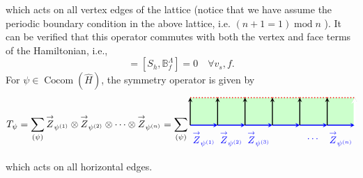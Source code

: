 \documentclass[a4paper,11pt]{article}
\theoremstyle{theorem}
\theoremstyle{remark}
\newcommand{\Av}{\mathbb{A}}
\newcommand{\Bf}{\mathbb{B}}
\newcommand{\ZR}{\overset{\rightarrow}{Z}}
\newcommand{\cone}{(1)}
\newcommand{\ctwo}{(2)}
\newcommand{\cthree}{(3)}
\newcommand{\Cocom}{\operatorname{Cocom}}
\begin{document}
which acts on all vertex edges of the lattice (notice that we have assume the periodic boundary condition in the above lattice, i.e. $(n+1=1 )\operatorname{mod} n$ ).
It can be verified that this operator commutes with both the vertex and face terms of the Hamiltonian, i.e.,
\begin{equation}
    [S_h, \Av_{v_s}^{\lambda}] = [S_h, \Bf_f^{\Lambda}] = 0 \quad \forall v_s, f.
\end{equation}
For $\psi\in \Cocom(\hat{H})$, the symmetry operator is given by 
\begin{equation}
    T_{\psi}=\sum_{(\psi)} \ZR_{\psi^{\cone}} \otimes \ZR_{\psi^{\ctwo}} \otimes \cdots \otimes \ZR_{\psi^{(n)}}
    = \sum_{(\psi)}
    \begin{aligned}
\begin{tikzpicture}
    \def\n{5}
    \def\s{1}
    \fill[green!20] (0, 0) rectangle (\n*\s+\s, \s); %
    \foreach \i in {0,...,\n} {
        \draw[-stealth, line width=1.0pt,blue, midway] (\i*\s, 0) -- (\i*\s+\s, 0);
        \draw[dotted, line width=1.0pt,red, midway] (\i*\s, \s) -- (\i*\s+\s, \s);
        \draw[-stealth,line width=1.0pt, midway] (\i*\s, 0) -- (\i*\s, \s);
    }
    \draw[-stealth, midway,line width=1.0pt] (\n*\s+\s, 0) -- (\n*\s+\s, \s);
    \node[ line width=0.2pt, dashed, draw opacity=0.5] (a) at (.5,-0.5){\color{blue}$\ZR_{\psi^{\cone}}$};
    \node[ line width=0.2pt, dashed, draw opacity=0.5] (a) at (1.5,-0.5){\color{blue}$\ZR_{\psi^{\ctwo}}$};
    \node[ line width=0.2pt, dashed, draw opacity=0.5] (a) at (2.5,-0.5){\color{blue}$\ZR_{\psi^{\cthree}}$};
    \node[ line width=0.2pt, dashed, draw opacity=0.5] (a) at (4.5,-0.5){\color{blue}$\cdots$};
     \node[ line width=0.2pt, dashed, draw opacity=0.5] (a) at (5.5,-0.5){\color{blue}$\ZR_{\psi^{(n)}}$};
      \draw[-stealth, white, line width=2pt, midway] (6, 0) -- (6, 1.02);
\end{tikzpicture}
\end{aligned}
\end{equation}
which acts on all horizontal edges.
\end{document}
